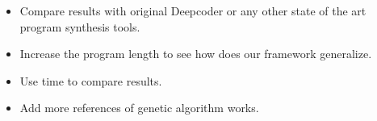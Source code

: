 \begin{TODO}
\begin{itemize}
    \item Compare results with original Deepcoder or any other state of the art program synthesis tools.
    
    \item Increase the program length to see how does our framework generalize.
    
    \item Use time to compare results.
    
    \item Add more references of genetic algorithm works. 
    
\end{itemize}
\end{TODO}